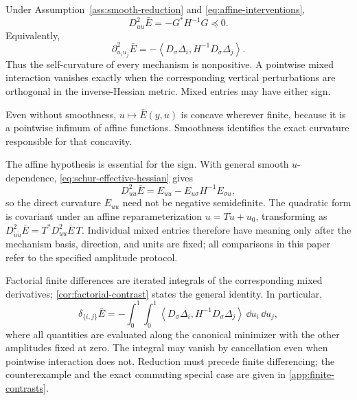 \begin{theorem}
\label{thm:interaction-curvature}
Under Assumption~\ref{ass:smooth-reduction} and
\cref{eq:affine-interventions},
\begin{equation}
  \boxed{
  D^2_{uu}\bar E=-G^*H^{-1}G\preceq0.}
  \label{eq:interaction-curvature}
\end{equation}
Equivalently,
\begin{equation}
  \partial^2_{u_i u_j}\bar E
  =-
  \left\langle
  D_\sigma\Delta_i,
  H^{-1}D_\sigma\Delta_j
  \right\rangle.
  \label{eq:pair-interaction-curvature}
\end{equation}
Thus the self-curvature of every mechanism is nonpositive.  A pointwise mixed
interaction vanishes exactly when the corresponding vertical perturbations
are orthogonal in the inverse-Hessian metric.  Mixed entries may have either
sign.
\end{theorem}

Even without smoothness, \(u\mapsto\bar E(y,u)\) is concave wherever finite,
because it is a pointwise infimum of affine functions.  Smoothness identifies
the exact curvature responsible for that concavity.

The affine hypothesis is essential for the sign.  With general smooth
\(u\)-dependence, \cref{eq:schur-effective-hessian} gives
\begin{equation}
  D^2_{uu}\bar E
  =E_{uu}-E_{u\sigma}H^{-1}E_{\sigma u},
  \label{eq:nonaffine-interaction-curvature}
\end{equation}
so the direct curvature \(E_{uu}\) need not be negative semidefinite.  The
quadratic form is covariant under an affine reparameterization
\(u=T\tilde u+u_0\), transforming as
\(D^2_{\tilde u\tilde u}\bar E=T^*D^2_{uu}\bar E\,T\).  Individual mixed
entries therefore have meaning only after the mechanism basis, direction,
and units are fixed; all comparisons in this paper refer to the specified
amplitude protocol.

Factorial finite differences are iterated integrals of the corresponding
mixed derivatives; \cref{cor:factorial-contrast} states the general identity.
In particular,
\begin{equation}
  \delta_{\{i,j\}}\bar E
  =-
  \int_0^1\!\int_0^1
  \left\langle D_\sigma\Delta_i,
  H^{-1}D_\sigma\Delta_j\right\rangle
  \,\dd u_i\,\dd u_j,
  \label{eq:pair-factorial-integral}
\end{equation}
where all quantities are evaluated along the canonical minimizer with the
other amplitudes fixed at zero.
The integral may vanish by cancellation even when pointwise interaction does
not.  Reduction must precede finite differencing; the counterexample and the
exact commuting special case are given in \cref{app:finite-contrasts}.


